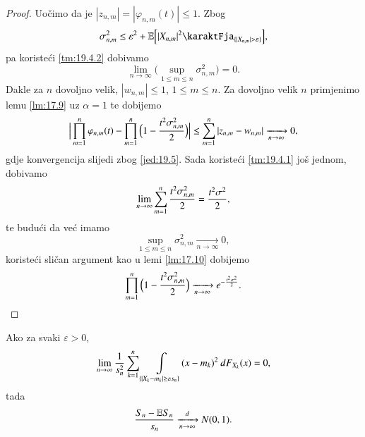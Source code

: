 \begin{proof}
    Uo\v cimo da je $|z_{n, m}| = |\varphi_{n, m} (t)| \leq 1$.
    Zbog
    \begin{equation*}
        \sigma_{n, m}^2 \leq \varepsilon^2 + \masE \Big[ |X_{n, m}|^2 \karaktFja_{\{ |X_{n, m}| > \varepsilon \}} \Big],    
    \end{equation*}
    pa koriste\' ci \ref{tm:19.4.2} dobivamo
    \begin{equation*}
        \lim\limits_{n \to \infty} \Big( \sup\limits_{1 \leq m \leq n} \sigma_{n, m}^2 \Big) = 0.
    \end{equation*}
    Dakle za $n$ dovoljno velik, $|w_{n, m}| \leq 1$, $1 \leq m \leq n$.
    Za dovoljno velik $n$ primjenimo lemu \ref{lm:17.9} uz $\alpha = 1$ te dobijemo
    \begin{equation*}
        \Big| \prod\limits_{m = 1}^{n} \varphi_{n, m} (t) - \prod\limits_{m = 1}^{n} \Big( 1 - \frac{t^2 \sigma_{n, m}^2}{2} \Big) \Big| \leq \sum\limits_{m = 1}^{n} |z_{n, m} - w_{n, m}| \xrightarrow[n \to \infty]{} 0,
    \end{equation*}
    gdje konvergencija slijedi zbog \eqref{jed:19.5}.
    Sada koriste\' ci \ref{tm:19.4.1} jo\v s jednom, dobivamo
    \begin{equation*}
        \lim\limits_{n \to \infty} \sum\limits_{m = 1}^{n} \frac{t^2 \sigma_{n, m}^2}{2} = \frac{t^2 \sigma^2}{2},
    \end{equation*}
    te budu\' ci da ve\' c imamo
    \begin{equation*}
        \sup\limits_{1 \leq m \leq n} \sigma_{n, m}^2 \xrightarrow[n \to \infty]{} 0,    
    \end{equation*}
    koriste\' ci sli\v can argument kao u lemi \ref{lm:17.10} dobijemo
    \begin{equation*}
        \prod\limits_{m = 1}^{n} \Big( 1 - \frac{t^2 \sigma_{n, m}^2}{2} \Big) \xrightarrow[n \to \infty]{} e^{- \frac{t^2 \sigma^2}{2}}.
    \end{equation*}
\end{proof}

\begin{kor}  \label{kor:19.6}
    \quad \newline
    Ako za svaki $\varepsilon > 0$,
    \begin{equation}    \label{jed:19.7}
        \lim\limits_{n \to \infty} \frac{1}{s_n^2} \sum\limits_{k = 1}^{n} \int\limits_{\{|X_k - m_k| \geq \varepsilon s_n\}} (x - m_k)^2 \: d F_{X_k} (x) = 0,
    \end{equation}
    tada
    \begin{equation*}
        \frac{S_n - \mathbb{E} S_n}{s_n} \xrightarrow[n \to \infty]{d} N(0,1).
    \end{equation*}
\end{kor}

